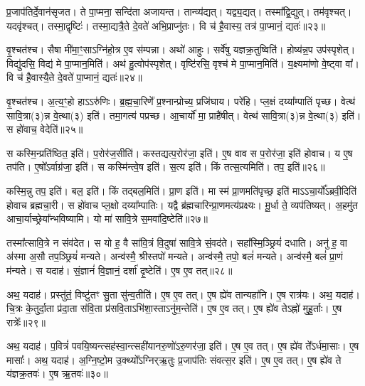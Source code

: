   प्र॒जाप॑तिर्दे॒वान॑सृजत।
   ते पा॒प्मना॒ सन्दि॑ता अजायन्त।
   तान्व्य॑द्यत्।
   यद्व्य॒द्यत्।
   तस्मा᳚द्वि॒द्युत्।
   तम॑वृश्चत्।
   यदवृ॑श्चत्।
   तस्मा॒द्वृष्टिः॑।
   तस्मा॒द्यत्रै॒ते दे॒वते॑ अभि॒प्राप्नु॑तः।
   वि च॑ है॒वास्य॒ तत्र॑ पा॒प्मानं॒ द्यतः॑॥२३॥

   वृ॒श्चत॑श्च।
   सैषा मी॑मा॒ꣳ॒साऽग्नि॑हो॒त्र ए॒व स॑म्पन्ना।
   अथो॑ आहुः।
   सर्वे॑षु यज्ञक्र॒तुष्विति॑।
   होष्य॑न्न॒प उप॑स्पृशेत्।
   विद्यु॑दसि॒ विद्य॑ मे पा॒प्मान॒मिति॑।
   अथ॑ हु॒त्वोप॑स्पृशेत्।
   वृष्टि॑रसि॒ वृश्च॑ मे पा॒प्मान॒मिति॑।
   य॒क्ष्यमा॑णो वे॒ष्ट्वा वा᳚।
   वि च॑ है॒वास्यै॒ते दे॒वते॑ पा॒प्मानं॒ द्यतः॑॥२४॥

   वृ॒श्चत॑श्च।
   अ॒त्य॒ꣳ॒हो हाऽऽरु॑णिः।
   ब्र॒ह्म॒चा॒रिणे᳚ प्र॒श्नान्प्रोच्य॒ प्रजि॑घाय।
   परे॑हि।
   प्ल॒क्षं दय्या᳚म्पातिं पृच्छ।
   वेत्थ॑ सावि॒त्रा(३)न्न वे॒त्था(३) इति॑।
   तमा॒गत्य॑ पप्रच्छ।
   आ॒चार्यो॑ मा॒ प्राहै॑षीत्।
   वेत्थ॑ सावि॒त्रा(३)न्न वे॒त्था(३) इति॑।
   स हो॑वाच॒ वेदेति॑॥२५॥

   स कस्मि॒न्प्रति॑ष्ठित॒ इति॑।
   प॒रोर॑ज॒सीति॑।
   कस्तद्यत्प॒रोर॑जा॒ इति॑।
   ए॒ष वाव स प॒रोर॑जा॒ इति॑ होवाच।
   य ए॒ष तप॑ति।
   ए॒षो᳚ऽर्वाग्र॑जा॒ इति॑।
   स कस्मि॑न्त्वे॒ष इति॑।
   स॒त्य इति॑।
   किं तत्स॒त्यमिति॑।
   तप॒ इति॑॥२६॥

   कस्मि॒न्नु तप॒ इति॑।
   बल॒ इति॑।
   किं तद्बल॒मिति॑।
   प्रा॒ण इति॑।
   मा स्म॑ प्रा॒णमति॑पृच्छ॒ इति॑ माऽऽचा॒र्यो᳚ऽब्रवी॒दिति॑ होवाच ब्रह्मचा॒री।
   स हो॑वाच प्ल॒क्षो दय्या᳚म्पातिः।
   यद्वै ब्र॑ह्मचारिन्प्रा॒णमत्य॑प्रक्ष्यः।
   मू॒र्धा ते॒ व्यप॑तिष्यत्।
   अ॒हमु॑त आचा॒र्याच्छ्रेया᳚न्भविष्यामि।
   यो मा॑ सावि॒त्रे स॒मवा॑दि॒ष्टेति॑॥२७॥

   तस्मा᳚त्सावि॒त्रे न संव॑देत।
   स यो ह॒ वै सा॑वि॒त्रं वि॒दुषा॑ सावि॒त्रे सं॒वद॑ते।
   सहा᳚स्मि॒ञ्छ्रियं॑ दधाति।
   अनु॑ ह॒ वा अ॑स्मा अ॒सौ तप॒ञ्छ्रियं॑ मन्यते।
   अन्व॑स्मै॒ श्रीस्तपो॑ मन्यते।
   अन्व॑स्मै॒ तपो॒ बलं॑ मन्यते।
   अन्व॑स्मै॒ बलं॑ प्रा॒णं म॑न्यते।
   स यदाह॑।
   सं॒ज्ञानं॑ वि॒ज्ञानं॒ दर्\mbox{}शा॑ दृ॒ष्टेति॑।
   ए॒ष ए॒व तत्॥२८॥

   अथ॒ यदाह॑।
   प्रस्तु॑तं॒ विष्टु॑तꣳ सु॒ता सु॑न्व॒तीति॑।
   ए॒ष ए॒व तत्।
   ए॒ष ह्ये॑व तान्यहा॑नि।
   ए॒ष रात्र॑यः।
   अथ॒ यदाह॑।
   चि॒त्रः के॒तुर्दा॒ता प्र॑दा॒ता स॑वि॒ता प्र॑सवि॒ताऽभि॑शा॒स्ताऽनु॑म॒न्तेति॑।
   ए॒ष ए॒व तत्।
   ए॒ष ह्ये॑व तेऽह्नो॑ मुहू॒र्ताः।
   ए॒ष रात्रेः᳚॥२९॥

   अथ॒ यदाह॑।
   प॒वित्रं॑ पवयि॒ष्यन्त्सह॑स्वा॒न्त्सही॑यानरु॒णो॑\-ऽरु॒णर॑जा॒ इति॑।
   ए॒ष ए॒व तत्।
   ए॒ष ह्ये॑व ते᳚ऽर्धमा॒साः।
   ए॒ष मासाः᳚।
   अथ॒ यदाह॑।
   अ॒ग्नि॒ष्टो॒म उ॒क्थ्यो᳚ऽग्निर्{‌}ऋ॒तुः प्र॒जाप॑तिः संवत्स॒र इति॑।
   ए॒ष ए॒व तत्।
   ए॒ष ह्ये॑व ते य॑ज्ञक्र॒तवः॑।
   ए॒ष ऋ॒तवः॑॥३०॥


